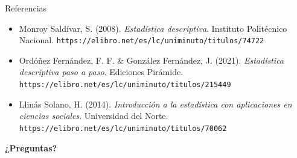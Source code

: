 \documentclass[aspectratio=169,10pt]{beamer}
\begin{document}
\begin{frame}{Referencias}
  \footnotesize
  \begin{itemize}
    \item[{[1]}] Monroy Saldívar, S. (2008). \textit{Estadística descriptiva}.
      Instituto Politécnico Nacional.
      \texttt{https://elibro.net/es/lc/uniminuto/titulos/74722}
    \item[{[2]}] Ordóñez Fernández, F. F. \& González Fernández, J. (2021).
      \textit{Estadística descriptiva paso a paso}. Ediciones Pirámide.
      \texttt{https://elibro.net/es/lc/uniminuto/titulos/215449}
    \item[{[3]}] Llinás Solano, H. (2014). \textit{Introducción a la
      estadística con aplicaciones en ciencias sociales}. Universidad del
      Norte. \texttt{https://elibro.net/es/lc/uniminuto/titulos/70062}
  \end{itemize}

  \vspace{0.35cm}
  \begin{center}
    {\Large\color{uniAzul}\textbf{¿Preguntas?}}
  \end{center}
\end{frame}
\end{document}
